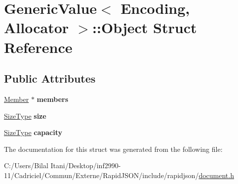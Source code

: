 \hypertarget{struct_generic_value_1_1_object}{}\section{Generic\+Value$<$ Encoding, Allocator $>$\+:\+:Object Struct Reference}
\label{struct_generic_value_1_1_object}
\subsection*{Public Attributes}
\begin{DoxyCompactItemize}
\item 
\hyperlink{class_generic_value_a7ccf27c44058b4c11c3efc6473afb886}{Member} $\ast$ {\bfseries members}\hypertarget{struct_generic_value_1_1_object_ab51b8366577cb12f0280e4a6d7dab926}{}\label{struct_generic_value_1_1_object_ab51b8366577cb12f0280e4a6d7dab926}

\item 
\hyperlink{rapidjson_8h_a5ed6e6e67250fadbd041127e6386dcb5}{Size\+Type} {\bfseries size}\hypertarget{struct_generic_value_1_1_object_a10da3d9035961100ed11f955a4afd2b6}{}\label{struct_generic_value_1_1_object_a10da3d9035961100ed11f955a4afd2b6}

\item 
\hyperlink{rapidjson_8h_a5ed6e6e67250fadbd041127e6386dcb5}{Size\+Type} {\bfseries capacity}\hypertarget{struct_generic_value_1_1_object_ab22a81c7ac57baf0d4ea343dfd6d8b33}{}\label{struct_generic_value_1_1_object_ab22a81c7ac57baf0d4ea343dfd6d8b33}

\end{DoxyCompactItemize}


The documentation for this struct was generated from the following file\+:\begin{DoxyCompactItemize}
\item 
C\+:/\+Users/\+Bilal Itani/\+Desktop/inf2990-\/11/\+Cadriciel/\+Commun/\+Externe/\+Rapid\+J\+S\+O\+N/include/rapidjson/\hyperlink{document_8h}{document.\+h}\end{DoxyCompactItemize}
